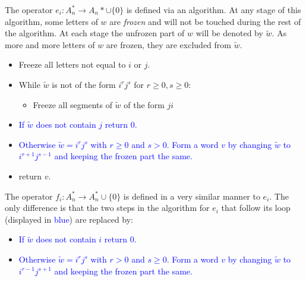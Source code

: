 \documentclass[12pt]{amsart}
\newcommand{\bc}[1]{\textcolor{blue}{#1}}
\theoremstyle{definition}
\theoremstyle{example}
\begin{document}
The operator $e_i:A_n^*\to A_n*\cup\{0\}$ is defined via an algorithm.
At any stage of this algorithm, some letters of $w$ are \emph{frozen} and will not be touched during the rest of the algorithm.
At each stage the unfrozen part of $w$ will be denoted by $\tilde w$.
As more and more letters of $w$ are frozen, they are excluded from $\tilde w$.
\begin{itemize}
\item Freeze all letters not equal to $i$ or $j$.
\item While $\tilde w$ is not of the form $i^rj^s$ for $r\geq 0, s\geq 0$:
  \begin{itemize}
  \item Freeze all segments of $\tilde w$ of the form $ji$
  \end{itemize}
\item \bc{If $\tilde w$ does not contain $j$ return $0$.}
\item \bc{Otherwise $\tilde w=i^rj^s$ with $r\geq 0$ and $s>0$.
  Form a word $v$ by changing $\tilde w$ to $i^{r+1}j^{s-1}$ and keeping the frozen part the same.}
\item return $v$.
\end{itemize}

The operator $f_i:A_n^*\to A_n^*\cup\{0\}$ is defined in a very similar manner to $e_i$.
The only difference is that the two steps in the algorithm for $e_i$ that follow its loop (displayed in \bc{blue}) are replaced by:
\begin{itemize}
\item \bc{If $\tilde w$ does not contain $i$ return $0$.}
\item \bc{Otherwise $\tilde w=i^rj^s$ with $r> 0$ and $s\geq 0$.
  Form a word $v$ by changing $\tilde w$ to $i^{r-1}j^{s+1}$ and keeping the frozen part the same.}
\end{itemize}
\end{document}
